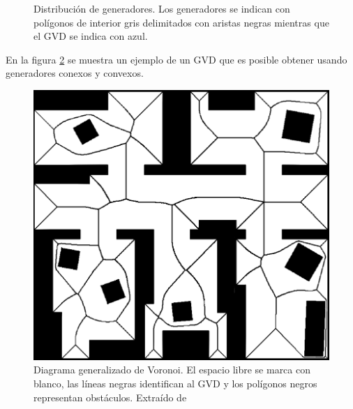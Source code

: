 \begin{figure}[H]
  \centering
  \qquad
  \caption[Distribución de generadores.]{Distribución de generadores. Los generadores se indican con polígonos de interior gris delimitados con aristas negras mientras que el GVD se indica con azul.}\label{fig:distriGen}
\end{figure}

En la figura \ref{fig:ejemploGVD} se muestra un ejemplo de un GVD que es posible obtener usando generadores conexos y convexos.

\begin{figure}[H]
  \centering
  \includegraphics[width=0.45\linewidth]{imagenes/GVD2.png}
  \caption[Diagrama generalizado de Voronoi.]{Diagrama generalizado de Voronoi. El espacio libre se marca con blanco, las líneas negras identifican al GVD y los polígonos negros representan obstáculos. Extraído de \cite{Wallgrun2005}}\label{fig:ejemploGVD}
\end{figure}


